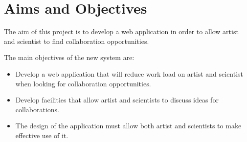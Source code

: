 \documentclass[a4paper,oneside,11pt]{report}
\begin{document}
\pagestyle{empty} %
\tableofcontents %
\cleardoublepage %
\pagestyle{plain} %
\setcounter{page}{1} %

\chapter{Aims and Objectives}

The aim of this project is to develop a web application in order to allow artist and scientist to find collaboration opportunities.

The main objectives of the new system are:
\begin{itemize}
	\item Develop a web application that will reduce work load on artist and scientist when looking for collaboration opportunities.
	\item Develop facilities that allow artist and scientists to discuss ideas for collaborations.
	\item The design of the application must allow both artist and scientists to make effective use of it.
\end{itemize}
	
\end{document}
